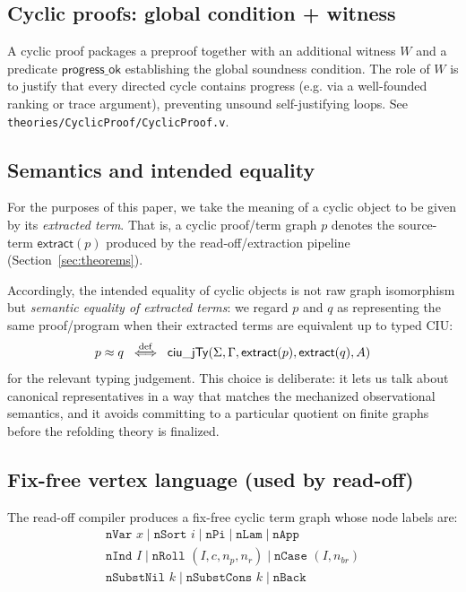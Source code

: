 \subsection{Cyclic proofs: global condition + witness}

A cyclic proof packages a preproof together with an additional witness \(W\) and a predicate \(\mathsf{progress\_ok}\) establishing the global soundness condition.
The role of \(W\) is to justify that every directed cycle contains progress (e.g. via a well-founded ranking or trace argument), preventing unsound self-justifying loops.
See \texttt{theories/CyclicProof/CyclicProof.v}.

\subsection{Semantics and intended equality}

For the purposes of this paper, we take the meaning of a cyclic object to be given by its \emph{extracted term}.
That is, a cyclic proof/term graph \(p\) denotes the source-term \(\mathsf{extract}(p)\) produced by the read-off/extraction pipeline (Section~\ref{sec:theorems}).

Accordingly, the intended equality of cyclic objects is not raw graph isomorphism but \emph{semantic equality of extracted terms}:
we regard \(p\) and \(q\) as representing the same proof/program when their extracted terms are equivalent up to typed CIU:
\[
  p \approx q \;\;\stackrel{\mathrm{def}}{\Longleftrightarrow}\;\; \mathsf{ciu\_jTy}(\Sigma,\Gamma,\mathsf{extract}(p),\mathsf{extract}(q),A)
\]
for the relevant typing judgement.
This choice is deliberate: it lets us talk about canonical representatives in a way that matches the mechanized observational semantics, and it avoids committing to a particular quotient on finite graphs before the refolding theory is finalized.

\subsection{Fix-free vertex language (used by read-off)}

The read-off compiler produces a fix-free cyclic term graph whose node labels are:
\[
\begin{array}{l}
\texttt{nVar }x \mid \texttt{nSort }i \mid \texttt{nPi} \mid \texttt{nLam} \mid \texttt{nApp} \\
\texttt{nInd }I \mid \texttt{nRoll }(I,c,n_p,n_r) \mid \texttt{nCase }(I,n_{br}) \\
\texttt{nSubstNil }k \mid \texttt{nSubstCons }k \mid \texttt{nBack}
\end{array}
\]


